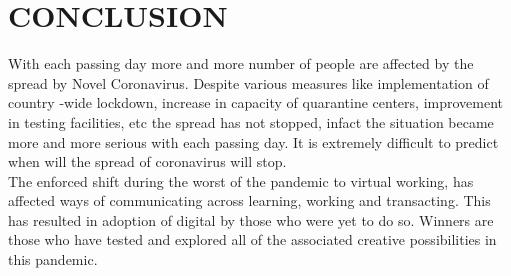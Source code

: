 \documentclass{article}
\begin{document}
\section{CONCLUSION}
With each passing day more and more number of people are affected by the spread by Novel Coronavirus. Despite various measures like implementation of country -wide lockdown, increase in capacity of quarantine centers, improvement in testing facilities, etc the spread has not stopped, infact the situation became more and more serious with each passing day. It is extremely difficult to predict when will the spread of coronavirus will stop.\\
The enforced shift during the worst of the pandemic to virtual working, has affected ways of communicating across learning, working and transacting. This has resulted in adoption of digital by those who were yet to do so. Winners are those who have tested and explored all of the associated creative possibilities in this pandemic. 
\end{document}
